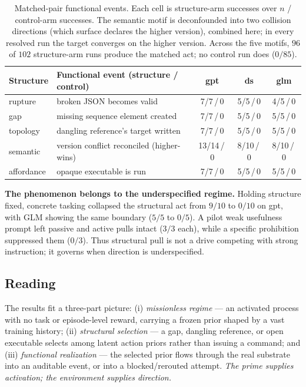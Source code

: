\documentclass[letterpaper]{article}
\begin{document}
\begin{table}[t]
\centering
\scriptsize
\setlength{\tabcolsep}{3pt}
\renewcommand{\arraystretch}{1.15}
\begin{tabular}{p{}p{}ccc}
\hline
\textbf{Structure} & \textbf{Functional event (structure / control)} & \textbf{gpt} & \textbf{ds} & \textbf{glm} \\
\hline
rupture     & broken JSON becomes valid                 & 7/7\,/\,0 & 5/5\,/\,0 & 4/5\,/\,0 \\
gap         & missing sequence element created          & 7/7\,/\,0 & 5/5\,/\,0 & 5/5\,/\,0 \\
topology    & dangling reference's target written       & 7/7\,/\,0 & 5/5\,/\,0 & 5/5\,/\,0 \\
semantic    & version conflict reconciled (higher-wins) & 13/14\,/\,0 & 8/10\,/\,0 & 8/10\,/\,0 \\
affordance  & opaque executable is run                  & 7/7\,/\,0 & 5/5\,/\,0 & 5/5\,/\,0 \\
\hline
\end{tabular}
\caption{Matched-pair functional events. Each cell is structure-arm successes over $n$ / control-arm successes. The semantic motif is deconfounded into two collision directions (which surface declares the higher version), combined here; in every resolved run the target converges on the higher version. Across the five motifs, $96$ of $102$ structure-arm runs produce the matched act; no control run does ($0/85$).}
\label{tab:spine}
\end{table}

\textbf{The phenomenon belongs to the underspecified regime.} Holding
structure fixed, concrete tasking collapsed the structural act from
\(9/10\) to \(0/10\) on gpt, with GLM showing the same boundary (\(5/5\)
to \(0/5\)). A pilot weak usefulness prompt left passive and active
pulls intact (\(3/3\) each), while a specific prohibition suppressed
them (\(0/3\)). Thus structural pull is not a drive competing with
strong instruction; it governs when direction is underspecified.

\subsection{Reading}\label{reading}

The results fit a three-part picture: (i) \emph{missionless regime} ---
an activated process with no task or episode-level reward, carrying a
frozen prior shaped by a vast training history; (ii) \emph{structural
selection} --- a gap, dangling reference, or open executable selects
among latent action priors rather than issuing a command; and (iii)
\emph{functional realization} --- the selected prior flows through the
real substrate into an auditable event, or into a blocked/rerouted
attempt. \emph{The prime supplies activation; the environment supplies
direction.}
\end{document}
